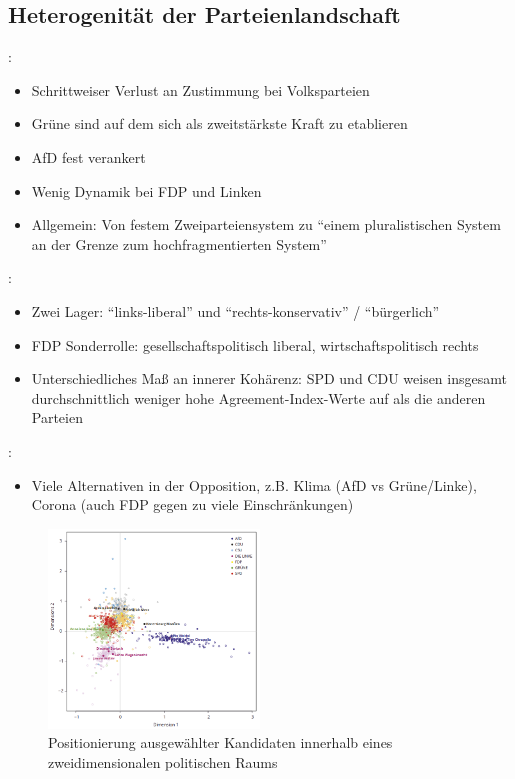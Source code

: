 \subsection{Heterogenität der Parteienlandschaft} \label{subsec:heterogenitätParteien}

\citeauthor{niedermayer_entwicklung_2020} \autocite{niedermayer_entwicklung_2020}:
\begin{itemize}
    \item Schrittweiser Verlust an Zustimmung bei Volksparteien
    \item Grüne sind auf dem sich als zweitstärkste Kraft zu etablieren
    \item AfD fest verankert
    \item Wenig Dynamik bei FDP und Linken
    \item Allgemein: Von festem Zweiparteiensystem zu \enquote{einem pluralistischen System an der Grenze zum hochfragmentierten System}
\end{itemize}

\citeauthor{thomeczek_politische_2019} \autocite{thomeczek_politische_2019}:
\begin{itemize}
    \item Zwei Lager: \enquote{links-liberal} und \enquote{rechts-konservativ} / \enquote{bürgerlich}
    \item FDP Sonderrolle: gesellschaftspolitisch liberal, wirtschaftspolitisch rechts
    \item Unterschiedliches Maß an innerer Kohärenz: SPD und CDU weisen insgesamt durchschnittlich weniger hohe Agreement-Index-Werte auf als die anderen Parteien
\end{itemize}

\citeauthor{engler_wettbewerb_2022} \autocite{engler_wettbewerb_2022}:
\begin{itemize}
    \item Viele Alternativen in der Opposition, z.B. Klima (AfD vs Grüne/Linke), Corona (auch FDP gegen zu viele Einschränkungen)
\end{itemize}

\begin{figure}[H]
    \centering
    \includegraphics[width=0.5\textwidth]{data/images/positionierung_ausgewaehlter_kandidaten.png}
    \caption[Positionierung ausgewählter Kandidaten \autocite{saltzer_bundestagswahl_2022}]{Positionierung ausgewählter Kandidaten innerhalb eines zweidimensionalen politischen Raums \autocite{saltzer_bundestagswahl_2022}} \label{fig:positionierungAusgewaehlterKanidaten}
\end{figure}

